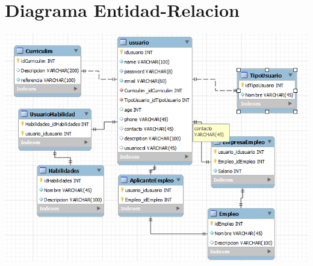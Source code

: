 \newpage


\section{Diagrama Entidad-Relacion}
\begin{center}
	\includegraphics[scale=1]{./resources/eer.png}
\end{center}